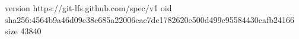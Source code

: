 version https://git-lfs.github.com/spec/v1
oid sha256:4564b9a46d09e38c685a22006eae7de1782620e500d499c95584430cafb24166
size 43840
